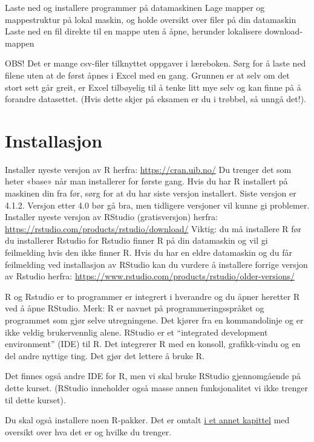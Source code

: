 \documentclass[
  norsk,
  letterpaper,
  DIV=11,
  numbers=noendperiod]{scrreprt}
\theoremstyle{definition}
\theoremstyle{remark}
\begin{document}
Laste ned og installere programmer på datamaskinen Lage mapper og
mappestruktur på lokal maskin, og holde oversikt over filer på din
datamaskin Laste ned en fil direkte til en mappe uten å åpne, herunder
lokalisere download-mappen

OBS! Det er mange csv-filer tilknyttet oppgaver i læreboken. Sørg for å
laste ned filene uten at de først åpnes i Excel med en gang. Grunnen er
at selv om det stort sett går greit, er Excel tilbøyelig til å tenke
litt mye selv og kan finne på å forandre datasettet. (Hvis dette skjer
på eksamen er du i trøbbel, så unngå det!).

\section{Installasjon}\label{installasjon}

Installer nyeste versjon av R herfra: \url{https://cran.uib.no/} Du
trenger det som heter «base» når man installerer for første gang. Hvis
du har R installert på maskinen din fra før, sørg for at du har siste
versjon installert. Siste versjon er 4.1.2. Versjon etter 4.0 bør gå
bra, men tidligere versjoner vil kunne gi problemer. Installer nyeste
versjon av RStudio (gratisversjon) herfra:
\url{https://rstudio.com/products/rstudio/download/} Viktig: du må
installere R før du installerer Rstudio for Rstudio finner R på din
datamaskin og vil gi feilmelding hvis den ikke finner R. Hvis du har en
eldre datamaskin og du får feilmelding ved installasjon av RStudio kan
du vurdere å installere forrige versjon av Rstudio herfra:
\url{https://www.rstudio.com/products/rstudio/older-versions/}

R og Rstudio er to programmer er integrert i hverandre og du åpner
heretter R ved å åpne RStudio. Merk: R er navnet på
programmeringsspråket og programmet som gjør selve utregningene. Det
kjører fra en kommandolinje og er ikke veldig brukervennlig alene.
RStudio er et ``integrated development environment'' (IDE) til R. Det
integrerer R med en konsoll, grafikk-vindu og en del andre nyttige ting.
Det gjør det lettere å bruke R.

Det finnes også andre IDE for R, men vi skal bruke RStudio gjennomgående
på dette kurset. (RStudio inneholder også masse annen funksjonalitet vi
ikke trenger til dette kurset).

Du skal også installere noen R-pakker. Det er omtalt
\href{https://torbskar.github.io/KvantForkurs_SOS_MA/kort_intro_R.html\#r-pakker}{i
et annet kapittel} med oversikt over hva det er og hvilke du trenger.
\end{document}
